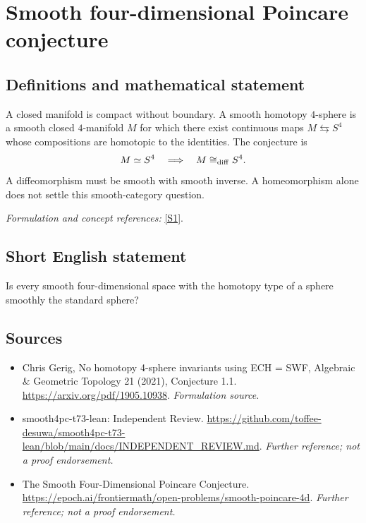\documentclass[11pt]{article}
\begin{document}
\section*{\texorpdfstring{Smooth four-dimensional Poincare conjecture}{Smooth four-dimensional Poincare conjecture}}\label{22}
\subsection{Definitions and mathematical statement}
A closed manifold is compact without boundary. A smooth homotopy $4$-sphere is a smooth closed $4$-manifold $M$ for which there exist continuous maps $M\leftrightarrows S^4$ whose compositions are homotopic to the identities. The conjecture is
\[
 M\simeq S^4\quad\Longrightarrow\quad M\cong_{\rm diff} S^4.
\]
A diffeomorphism must be smooth with smooth inverse. A homeomorphism alone does not settle this smooth-category question.
\par\smallskip\textit{Formulation and concept references:} \href{https://arxiv.org/pdf/1905.10938}{[S1]}.

\subsection{Short English statement}
Is every smooth four-dimensional space with the homotopy type of a sphere smoothly the standard sphere?
\subsection{Sources}
\begin{itemize}
\item[S1]Chris Gerig, No homotopy 4-sphere invariants using ECH = SWF, Algebraic \& Geometric Topology 21 (2021), Conjecture 1.1.
\url{https://arxiv.org/pdf/1905.10938}.
\textit{Formulation source.}
\item[S2]smooth4pc-t73-lean: Independent Review.
\url{https://github.com/toffee-desuwa/smooth4pc-t73-lean/blob/main/docs/INDEPENDENT_REVIEW.md}.
\textit{Further reference; not a proof endorsement.}
\item[S3]The Smooth Four-Dimensional Poincare Conjecture.
\url{https://epoch.ai/frontiermath/open-problems/smooth-poincare-4d}.
\textit{Further reference; not a proof endorsement.}
\end{itemize}
\end{document}
